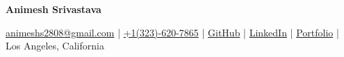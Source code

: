 \documentclass[10pt, letterpaper]{article}
\newenvironment{onecolentry}{
    \par\noindent
}{
    \par
}
\newenvironment{header}{
    \setlength{\topsep}{0pt}\par\kern\topsep\centering\linespread{1.5}
}{
    \par\kern\topsep
}
\begin{document}
\begin{header}
    \fontsize{20 pt}{20 pt}\selectfont \textbf{Animesh Srivastava}
\end{header}
    

\begin{onecolentry}
    \centering
    \small
    \href{mailto:animeshs2808@gmail.com}{animeshs2808@gmail.com} \quad | \quad 
    \href{tel:+1-323-620-7865}{+1(323)-620-7865} \quad | \quad 
    \href{https://github.com/animatrix28}{GitHub} \quad | \quad 
    \href{https://www.linkedin.com/in/animesh28/}{LinkedIn} \quad | \quad 
    \href{https://animatrix28.github.io/}{Portfolio} \quad | \quad
    Los Angeles, California
\end{onecolentry}



\end{document}
